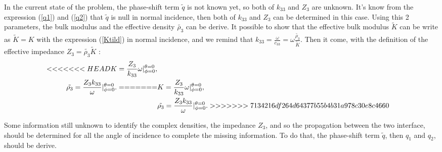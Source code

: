\documentclass{article}
\begin{document}
    In the current state of the problem, the phase-shift term $\tilde{q}$ is not known yet, so both of $k_{33}$ and $Z_3$ are unknown. It's know from the expression (\ref{q1}) and (\ref{q2}) that $\tilde{q}$ is null in normal incidence, then both of $k_{33}$ and $Z_3$ can be determined in this case. 
    Using this 2 parameters, the bulk modulus and the effective density $\tilde{\rho_3}$ can be derive. It possible to show that the effective bulk modulus $\tilde{K}$ can be write as $\tilde{K}=K$ with the expression (\ref{Ktild}) in normal incidence, and we remind that $k_{33}=\frac{\omega}{c_{33}}=\omega\frac{\tilde{\rho_3}}{\tilde{K}}$. Then it come, with the definition of the effective impedance $Z_3=\tilde{\rho_3}\tilde{K}$ :
    \begin{align}
<<<<<<< HEAD
        K=\frac{Z_3}{k_{33}}\omega|^{\theta=0}_{\phi=0},\\
        \tilde{\rho_3}=\frac{Z_3k_{33}}{\omega}|^{\theta=0}_{\phi=0}.
=======
        &K=\frac{Z_3}{k_{33}}\omega\Large{|}^{\theta=0}_{\phi=0},\\
        &\tilde{\rho_3}=\frac{Z_3k_{33}}{\omega}\Large{|}^{\theta=0}_{\phi=0}.
>>>>>>> 7134216df264d64377b55b4b31a978c30e8c4660
    \end{align}
    
    Some information still unknown to identify the complex densities, the impedance $Z_3$, and so the propagation between the two interface, should be determined for all the angle of incidence to complete the missing information. To do that, the phase-shift term $\tilde{q}$, then $q_1$ and $q_2$, should be derive. 
    
\end{document}
